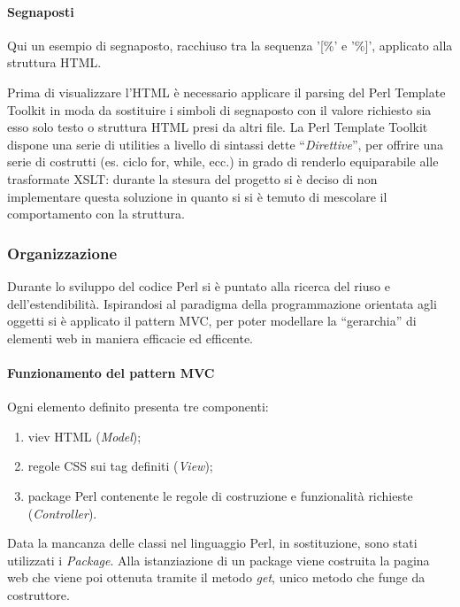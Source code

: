 \paragraph*{Segnaposti} Qui un esempio di segnaposto, racchiuso tra la sequenza '[\%' e '\%]', applicato alla struttura HTML.


Prima di visualizzare l'HTML \`e necessario applicare il parsing del Perl Template Toolkit in moda da sostituire i simboli di segnaposto con il valore richiesto sia esso solo testo o struttura HTML presi da altri file.
La Perl Template Toolkit dispone una serie di utilities a livello di sintassi dette ``\textit{Direttive}'', per offrire una serie di costrutti (es. ciclo for, while, ecc.) in grado di renderlo equiparabile alle trasformate XSLT: durante la stesura del progetto si \`e deciso di non implementare questa soluzione in quanto si si \`e temuto di mescolare il comportamento con la struttura.


\subsubsection{Organizzazione}
Durante lo sviluppo del codice Perl si \`e puntato alla ricerca del riuso e dell'estendibilit\`a. Ispirandosi al paradigma della programmazione orientata agli oggetti si \`e applicato il pattern MVC, per poter modellare la ``gerarchia'' di elementi web in maniera efficacie ed efficente.

\paragraph*{Funzionamento del pattern MVC}Ogni elemento definito presenta tre componenti:
\begin{enumerate}
    \item viev HTML (\textit{Model});
    \item regole CSS sui tag definiti (\textit{View});
    \item package Perl contenente le regole di costruzione e funzionalit\`a richieste (\textit{Controller}).
\end{enumerate}

Data la mancanza delle classi nel linguaggio Perl, in sostituzione, sono stati utilizzati i \textit{Package}. Alla istanziazione di un package viene costruita la pagina web che viene poi ottenuta tramite il metodo \textit{get}, unico metodo che funge da costruttore.

